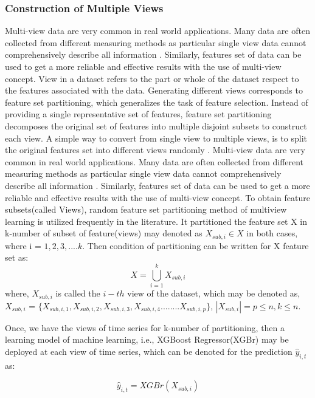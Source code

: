\subsubsection{Construction of Multiple Views}
Multi-view data are very common in real world applications. Many data are often collected from different measuring methods as particular single view data cannot comprehensively describe all information \cite{zhao2017multi}. Similarly, features set of data can be used to get a more reliable and effective results with the use of multi-view concept. View in a dataset refers to the part or whole of the dataset respect to the features associated with the data. Generating different views corresponds to feature set partitioning, which generalizes the task of feature selection. Instead of providing a single representative set of features, feature set partitioning decomposes the original set of features into multiple disjoint subsets to construct each view. A simple way to convert from single view to multiple views, is to split the original features set into different views randomly \cite{xu2013survey}. Multi-view data are very common in real world applications. Many data are often collected from different measuring methods as particular single view data cannot comprehensively describe all information \cite{zhao2017multi}. Similarly, features set of data can be used to get a more reliable and effective results with the use of multi-view concept. To obtain feature subsets(called Views), random feature set partitioning method of multiview learning is utilized frequently in the literature. It partitioned the feature set X  in k-number of subset of feature(views) may denoted as $X_{sub, i} \in X$  in both cases, where i = ${1, 2, 3,....k}$. Then condition of partitioning can be written for X feature set as:
\begin{equation}
\label{Eq.6}
    X = \bigcup_{i=1}^{k} X_{sub, i} 
\end{equation}
where, $X_{sub, i}$  is called the $i-th$ view of the dataset, which may be denoted as,  $X_{sub, i}$ = $\{X_{sub, i, 1}, X_{sub, i, 2}, X_{sub, i, 3}, X_{sub, i, 4}........X_{sub, i, p}\}$,  $\left | X_{sub, i} \right |= p\leq n , k\leq n$.


 Once, we have the views of time series for k-number of partitioning, then a learning model of machine learning, i.e.,  XGBoost Regressor(XGBr) may be deployed at each view of time series, which can be denoted for the prediction $\hat{y}_{i, t}$ as:

\begin{equation}
\label{Eq.8}
    \hat{y}_{i, t} = XGBr(X_{sub, i})
\end{equation} 

